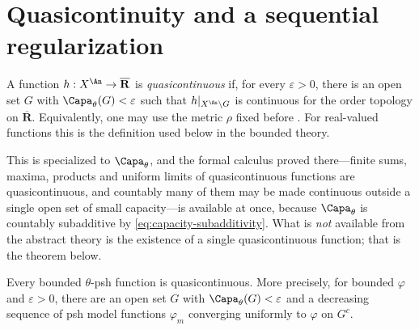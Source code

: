 \section{Quasicontinuity and a sequential regularization}
\label{sec:ch25-quasicontinuity}

\begin{definition}
\label{def:ch25-quasicontinuous}
A function $h:X^{\An}\to\overline{\mathbf R}$ is
\emph{quasicontinuous} if, for every $\varepsilon>0$, there is an open set
$G$ with $\Capa_\theta(G)<\varepsilon$ such that
$h|_{X^{\An}\setminus G}$ is continuous for the order topology on
$\overline{\mathbf R}$.  Equivalently, one may use the metric $\rho$ fixed
before .  For real-valued functions this is
the definition used below in the bounded theory.
\end{definition}

This is  specialized to $\Capa_\theta$, and the
formal calculus proved there---finite sums, maxima, products and uniform
limits of quasicontinuous functions are quasicontinuous, and countably many
of them may be made continuous outside a single open set of small
capacity---is available at once, because $\Capa_\theta$ is countably
subadditive by \eqref{eq:capacity-subadditivity}.  What is \emph{not}
available from the abstract theory is the existence of a single
quasicontinuous function; that is the theorem below.

\begin{theorem}
\label{thm:bounded-quasicontinuity}
Every bounded $\theta$-psh function is quasicontinuous. More precisely,
for bounded $\varphi$ and $\varepsilon>0$, there are an open set $G$
with $\Capa_\theta(G)<\varepsilon$ and a decreasing sequence of psh model
functions $\varphi_m$ converging uniformly to $\varphi$ on $G^c$.
\end{theorem}

